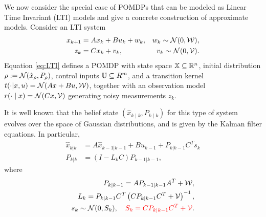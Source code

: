 \documentclass{ifacconf}
\newcommand{\red}[1]{{\color{red} #1}}
\newcommand{\new}[1]{{\color{blue}#1}}
\begin{document}
We now consider the special case of POMDPs that can be modeled as Linear Time Invariant (LTI) models and give a concrete construction of approximate models. Consider an LTI system
\begin{equation}
  \label{eq:LTI}
    \begin{aligned}
    x_{k+1}&=A x_{k} + B u_k+ w_k, & w_k\sim \mathcal N(0,\mathcal{W}), \\
    z_k&=Cx_k+v_k, & v_k\sim \mathcal N(0,\mathcal{V}).
  \end{aligned}
\end{equation}
Equation \eqref{eq:LTI} defines a \new{POMDP} with state space ${\mathbb{X}}\subseteq\mathbb R^n$, initial distribution $\rho:=\mathcal N(\hat x_\rho,P_\rho)$, control inputs ${\mathbb{U}} \subseteq R^m$, and a transition kernel $t(\cdot | x, u ) = \mathcal N(Ax + Bu, \mathcal{W})$, together with an observation model $r(\cdot \mid x) = \mathcal N(Cx, \mathcal{V})$ generating noisy measurements $z_k$.

It is well known that the belief state $(\hat x_{k \mid k}, P_{k \mid k})$ for this type of system evolves over the space of Gaussian distributions, and is given by the Kalman filter equations. In particular,
\begin{align}
  \label{eq:beliefx} \hat x_{k|k}&=A\hat x_{k-1|k-1}+Bu_{k-1}+P_{k|k-1}C^Ts_k \\
  \label{eq:beliefP} P_{k|k}&= (I - L_k C) P_{k-1|k-1},
\end{align}
where
\begin{equation}
\begin{aligned}
  P_{k|k-1}=AP_{k-1|k-1}A^T+\mathcal W, \\
  L_k = P_{k|k-1}C^T\left(CP_{k|k-1}C^T+\mathcal V\right)^{-1}, \\
  s_k\sim \mathcal N (0, S_k ), \quad \red{S_k = CP_{k|k-1}C^T+\mathcal V} .
\end{aligned}
\end{equation}
\end{document}
